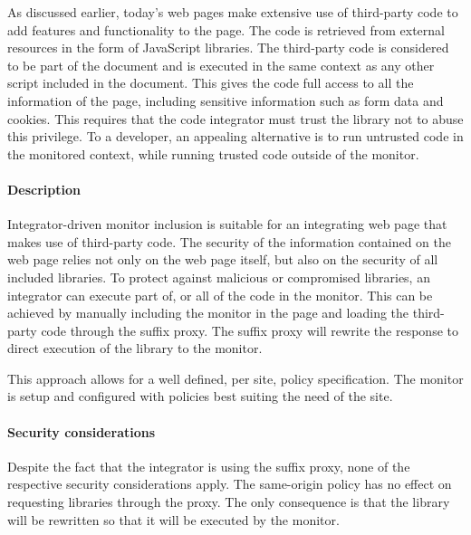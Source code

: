 \documentclass{llncs}
\newcommand{\todo}[1]{\colorbox{red}{\textcolor{white}{\sffamily\bfseries\scriptsize TODO}} \textcolor{red}{#1} \textcolor{red}{$\blacktriangleleft$}}
\begin{document}
As discussed earlier, today's
 web pages make extensive use of third-party code to add features 
and functionality to the page. The code is retrieved from external resources in 
the form of JavaScript libraries. The third-party code is considered to be part 
of the document and is executed in the same context as any other script 
included in the document. This gives the code full access to all the information 
of the page, including sensitive information such as form data and cookies. 
This requires that the code integrator must 
trust the library not to abuse this privilege. To a developer, an appealing alternative 
is to run untrusted code in the monitored context, while running trusted code outside of the 
monitor. 

\paragraph{Description}
Integrator-driven monitor inclusion is suitable for an integrating web page 
that makes use of third-party code.
The security of the information contained on the web 
page relies not only on the web page itself, but also on the security of all 
included libraries. To protect against malicious or compromised libraries, 
an integrator can execute part of, or all of the code in the monitor.
This can be achieved by manually including the monitor in the page and loading the 
third-party code through the suffix proxy. The suffix proxy will rewrite the 
response to direct execution of the library to the monitor. 

This approach allows for a well defined, per site, policy specification.
The monitor is setup and configured with policies best suiting the need of the 
site. 

\paragraph{Security considerations}

Despite the fact that the integrator is using the suffix proxy, none of the 
respective security considerations apply. The same-origin policy has no effect 
on requesting libraries through the proxy. The only consequence is that the library
will be rewritten so that it will be executed by the monitor.
\end{document}
